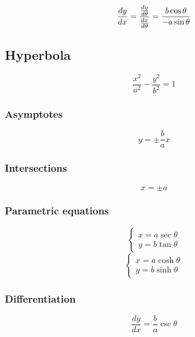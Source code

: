 \documentclass[a4paper,9pt]{scrartcl}
\begin{document}
    \begin{displaymath}
        \frac{dy}{dx} = \frac{\frac{dy}{d\theta}}{\frac{dx}{d\theta}} = \frac{b\cos\theta}{-a\sin\theta} \\
    \end{displaymath}

    \subsection{Hyperbola}

    \begin{displaymath}
        \frac{x^2}{a^2} - \frac{y^2}{b^2} = 1
    \end{displaymath}

    \subsubsection{Asymptotes}
    \begin{displaymath}
        y = \pm\frac{b}{a}x
    \end{displaymath}

    \subsubsection{Intersections}
    \begin{displaymath}
        x = {\pm}a
    \end{displaymath}

    \subsubsection{Parametric equations}
    \begin{displaymath}
        \left\{
        \begin{array}{c}
            x = a\sec\theta \\
            y = b\tan\theta
        \end{array}
    \end{displaymath}
    \begin{displaymath}
        \left\{
        \begin{array}{c}
            x = a\cosh\theta \\
            y = b\sinh\theta
        \end{array}
    \end{displaymath}

    \subsubsection{Differentiation}
    \begin{displaymath}
        \frac{dy}{dx} = \frac{b}{a}\csc\theta
    \end{displaymath}
\end{document}
